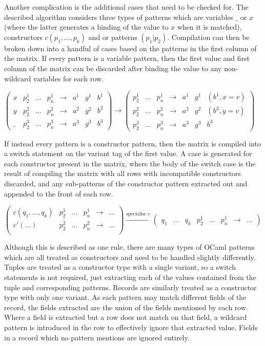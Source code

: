 Another complication is the additional cases that need to be checked for. The described algorithm considers three types of patterns which are variables $\_$ or $x$ (where the latter generates a binding of the value to $x$ when it is matched), constructors $c(p_1, \dots, p_k)$ and or patterns $(p_1 | p_2)$. Compilation can then be broken down into a handful of cases based on the patterns in the first column of the matrix. If every pattern is a variable pattern, then the first value and first column of the matrix can be discarded after binding the value to any non-wildcard variables for each row. 

$
\begin{pmatrix}
x & p^1_2 & \dots & p^1_n & \to & a^1 & g^1 & b^1 \\
y & p^2_2 & \dots & p^2_n & \to & a^2 & g^2 & b^2 \\
\_ & p^3_2 & \dots & p^3_n & \to & a^3 & g^3 & b^3
\end{pmatrix}
\to
\begin{pmatrix}
 p^1_2 & \dots & p^1_n  & \to & a^1 & g^1 & (b^1, x=v) \\
 p^2_2 & \dots & p^2_n  & \to & a^2 & g^2 & (b^2, y=v) \\
 p^3_2 & \dots & p^3_n  & \to & a^3 & g^3 & b^3
\end{pmatrix}
$

If instead every pattern is a constructor pattern, then the matrix is compiled into a switch statement on the variant tag of the first value. A case is generated for each constructor present in the matrix, where the body of the switch case is the result of compiling the matrix with all rows with incompatible constructors discarded, and any sub-patterns of the constructor pattern extracted out and appended to the front of each row. 

$
\begin{pmatrix}
c(q_1, \dots, q_k) & p^1_2 & \dots & p^1_n & \to & \dots \\
c'(\dots) & p^2_2 & \dots & p^2_n & \to & \dots \\
\end{pmatrix}
\xrightarrow{\text{specialise } c}
\begin{pmatrix}
 q_1 & \dots & q_k & p^1_2 & \dots & p^1_n  & \to & \dots 
\end{pmatrix}
$

Although this is described as one rule, there are many types of OCaml patterns which are all treated as constructors and need to be handled slightly differently. Tuples are treated as a constructor type with a single variant, so a switch statements is not required, just extracting each of the values contained from the tuple and corresponding patterns. Records are similarly treated as a constructor type with only one variant. As each pattern may match different fields of the record, the fields extracted are the union of the fields mentioned by each row. Where a field is extracted but a row does not match on that field, a wildcard pattern is introduced in the row to effectively ignore that extracted value.  Fields in a record which no pattern mentions are ignored entirely.

